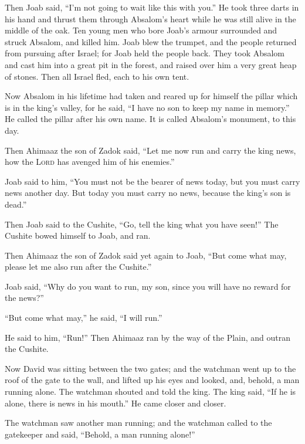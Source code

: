  Then Joab said, ``I'm not going to wait like this with
you.'' He took three darts in his hand and thrust them through Absalom's
heart while he was still alive in the middle of the oak. 
Ten young men who bore Joab's armour surrounded and struck Absalom, and
killed him.  Joab blew the trumpet, and the people
returned from pursuing after Israel; for Joab held the people back.
 They took Absalom and cast him into a great pit in the
forest, and raised over him a very great heap of stones. Then all Israel
fled, each to his own tent.

 Now Absalom in his lifetime had taken and reared up for
himself the pillar which is in the king's valley, for he said, ``I have
no son to keep my name in memory.'' He called the pillar after his own
name. It is called Absalom's monument, to this day.

 Then Ahimaaz the son of Zadok said, ``Let me now run and
carry the king news, how the \textsc{Lord} has avenged him of his
enemies.''

 Joab said to him, ``You must not be the bearer of news
today, but you must carry news another day. But today you must carry no
news, because the king's son is dead.''

 Then Joab said to the Cushite, ``Go, tell the king what
you have seen!'' The Cushite bowed himself to Joab, and ran.

 Then Ahimaaz the son of Zadok said yet again to Joab,
``But come what may, please let me also run after the Cushite.''

Joab said, ``Why do you want to run, my son, since you will have no
reward for the news?''

 ``But come what may,'' he said, ``I will run.''

He said to him, ``Run!'' Then Ahimaaz ran by the way of the Plain, and
outran the Cushite.

 Now David was sitting between the two gates; and the
watchman went up to the roof of the gate to the wall, and lifted up his
eyes and looked, and, behold, a man running alone.  The
watchman shouted and told the king. The king said, ``If he is alone,
there is news in his mouth.'' He came closer and closer.

 The watchman saw another man running; and the watchman
called to the gatekeeper and said, ``Behold, a man running alone!''

